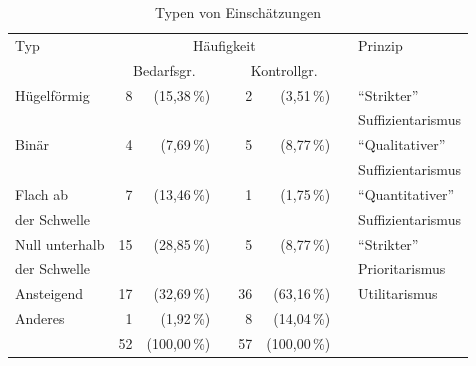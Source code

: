 \documentclass[justified,nobib,nohyper,symmetric,twoside]{tufte-book}
\begin{document}
\begin{table}[t]
   \caption{Typen von Einschätzungen}\label{tab:typen}
   \begin{center}
   \begin{tabular}{lrrrrrrl}
   \hline
   Typ              & \multicolumn{5}{c}{Häufigkeit}   &   & Prinzip                                                           \\
   \cline{2-6}
                    & \multicolumn{2}{c}{Bedarfsgr.}   &   & \multicolumn{2}{c}{Kontrollgr.}   &   &                           \\
   \hline\hline
   Hügelförmig      &  8   &  (15,38\,\%)              &   &  2   &   (3,51\,\%)               &   & \enquote{Strikter}        \\[-0.75ex]
                    &      &                           &   &      &                            &   & Suffizientarismus         \\[0.75ex]
   Binär            &  4   &   (7,69\,\%)              &   &  5   &   (8,77\,\%)               &   & \enquote{Qualitativer}    \\[-0.75ex]
                    &      &                           &   &      &                            &   & Suffizientarismus         \\[0.75ex]
   Flach ab         &  7   &  (13,46\,\%)              &   &  1   &   (1,75\,\%)               &   & \enquote{Quantitativer}   \\[-0.75ex]
   der Schwelle     &      &                           &   &      &                            &   & Suffizientarismus         \\[0.75ex]
   Null unterhalb   & 15   &  (28,85\,\%)              &   &  5   &   (8,77\,\%)               &   & \enquote{Strikter}        \\[-0.75ex]
   der Schwelle     &      &                           &   &      &                            &   & Prioritarismus            \\[0.75ex]
   Ansteigend       & 17   &  (32,69\,\%)              &   & 36   &  (63,16\,\%)               &   & Utilitarismus             \\[0.75ex]
   Anderes          &  1   &   (1,92\,\%)              &   &  8   &  (14,04\,\%)               &   &                           \\
   \hline
                    & 52   & (100,00\,\%)              &   & 57   & (100,00\,\%)               &   &                           \\
   \hline
   \end{tabular}
   \end{center}
\end{table}
\end{document}
